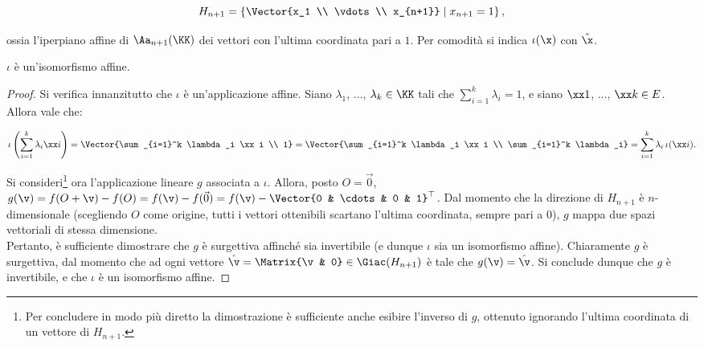 \documentclass[11pt]{article}
\begin{document}
	\[ H_{n+1} = \left\{ \Vector{x_1 \\ \vdots \\ x_{n+1}} \;\middle\vert\; x_{n+1} = 1 \right\}, \]
	
	\vskip 0.15in
	
	ossia l'iperpiano affine di $\Aa_{n+1}(\KK)$ dei vettori con l'ultima coordinata pari a $1$. Per comodità
	si indica $\iota(\x)$ con $\hat \x$.
	
	\begin{proposition}
		$\iota$ è un'isomorfismo affine.
	\end{proposition}
	
	\begin{proof}
		Si verifica innanzitutto che $\iota$ è un'applicazione affine. Siano $\lambda_1$, ..., $\lambda_k \in \KK$ tali
		che $\sum_{i=1}^k \lambda_i = 1$, e siano $\xx 1$, ..., $\xx k \in E$. Allora vale che:
		
		\[ \iota\left( \sum_{i=1}^k \lambda_i \xx i \right) = \Vector{\sum_{i=1}^k \lambda_i \xx i \\ 1} = \Vector{\sum_{i=1}^k \lambda_i \xx i \\ \sum_{i=1}^k \lambda_i} = \sum_{i=1}^k \lambda_i \, \iota(\xx i). \]
		
		\vskip 0.05in
		
		Si consideri\footnote{Per concludere in modo più diretto la dimostrazione è sufficiente anche esibire l'inverso di $g$, ottenuto ignorando l'ultima coordinata di un vettore di $H_{n+1}$.} ora l'applicazione lineare $g$ associata a $\iota$. Allora, posto $O = \vec 0$, $g(\v) = f(O + \v) - f(O) =
		f(\v) - f(\vec 0) = f(\v) - \Vector{0 & \cdots & 0 & 1}^\top$. Dal momento che la direzione di $H_{n+1}$ è
		$n$-dimensionale (scegliendo $O$ come origine, tutti i vettori ottenibili scartano l'ultima coordinata, sempre
		pari a $0$), $g$ mappa due spazi vettoriali di stessa dimensione. \\
		
		Pertanto, è sufficiente dimostrare che $g$ è surgettiva affinché sia invertibile (e dunque $\iota$ sia un isomorfismo affine). Chiaramente $g$ è surgettiva, dal momento che ad ogni vettore $\hat \v = \Matrix{\v & 0} \in \Giac(H_{n+1})$ è tale che $g(\v) = \hat \v$. Si conclude dunque che $g$ è invertibile, e che $\iota$ è
		un isomorfismo affine.
	\end{proof}
\end{document}
